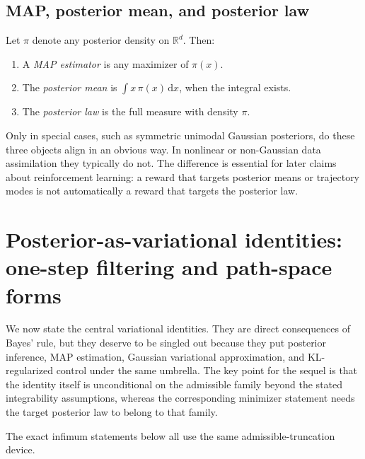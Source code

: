 \documentclass[11pt]{article}
\newcommand{\R}{\mathbb{R}}
\newcommand{\dd}{\,\mathrm d}
\numberwithin{equation}{section}
\theoremstyle{plain}
\theoremstyle{definition}
\theoremstyle{remark}
\begin{document}
\subsection{MAP, posterior mean, and posterior law}

Let $\pi$ denote any posterior density on $\R^d$. Then:
\begin{enumerate}[label=\arabic*.]
\item A \emph{MAP estimator} is any maximizer of $\pi(x)$.
\item The \emph{posterior mean} is $\int x\,\pi(x)\dd x$, when the integral exists.
\item The \emph{posterior law} is the full measure with density $\pi$.
\end{enumerate}
Only in special cases, such as symmetric unimodal Gaussian posteriors, do these three objects align in an obvious way. In nonlinear or non-Gaussian data assimilation they typically do not. The difference is essential for later claims about reinforcement learning: a reward that targets posterior means or trajectory modes is not automatically a reward that targets the posterior law.

\section{Posterior-as-variational identities: one-step filtering and path-space forms}
\label{sec:variational-posterior}

We now state the central variational identities. They are direct consequences of Bayes' rule, but they deserve to be singled out because they put posterior inference, MAP estimation, Gaussian variational approximation, and KL-regularized control under the same umbrella. The key point for the sequel is that the identity itself is unconditional on the admissible family beyond the stated integrability assumptions, whereas the corresponding minimizer statement needs the target posterior law to belong to that family.

The exact infimum statements below all use the same admissible-truncation device.
\end{document}
